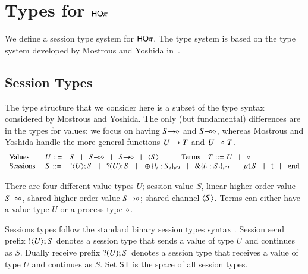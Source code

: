 \section{Types for $\mathsf{HO}\pi$}

We define a session type system for $\mathsf{HO}\pi$.
The type system is based on the type system developed by Mostrous
and Yoshida in~\cite{tlca07}.

\subsection{Session Types}

The type structure that we consider here is a subset of the type syntax considered by Mostrous and Yoshida.
The only (but fundamental) differences are in the types for values: we focus on having 
$S\!\! \rightarrow\!\! \diamond$ and $S\!\! \multimap\!\! \diamond$, whereas Mostrous and Yoshida handle the more general functions $U \rightarrow T$ and 
$U \multimap T$.
\[
	\begin{array}{lcl}
		\text{Values} & U ::= & S \bnfbar \lhot{S} \bnfbar \shot{S} \bnfbar \chtype{S} \qquad \quad \text{Terms} \quad T ::= U  \bnfbar  \Proc\\
		\text{Sessions} \ & S ::= &  \btout{U} S \bnfbar \btinp{U} S
		\bnfbar		\btsel{l_i:S_i}_{i \in I} \bnfbar \btbra{l_i:S_i}_{i \in I} \bnfbar \trec{t}{S} \bnfbar \vart{t}  \bnfbar \tinact 
	\end{array}
\]

There are four different value types $U$; session value $S$, linear higher order value $S\!\! \multimap\!\! \diamond$, 
shared higher order value $S\!\! \rightarrow\!\! \diamond$; shared channel $\langle S \rangle$. Terms can either have a
value type $U$ or a process type $\diamond$.

Sessions types follow the standard binary session types syntax \cite{}. Session send prefix $! \langle U \rangle ; S$ 
denotes a session type that sends a value of type $U$ and continues as $S$. Dually receive prefix $? (U) ; S$
denotes a session type that receives a value of type $U$ and continues as $S$. 
Set $\mathsf{ST}$ is the space of all session types.

